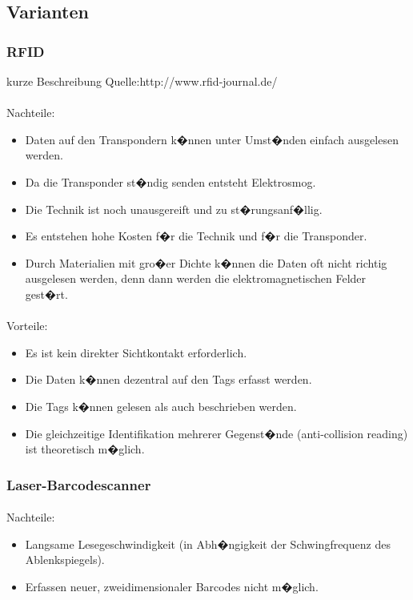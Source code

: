 \subsection{Varianten}

\subsubsection{RFID}

kurze Beschreibung
Quelle:http://www.rfid-journal.de/

\paragraph*{}
Nachteile:
\begin{itemize}
\item Daten auf den Transpondern k�nnen unter Umst�nden einfach ausgelesen werden.
\item Da die Transponder st�ndig senden entsteht Elektrosmog.
\item Die Technik ist noch unausgereift und zu st�rungsanf�llig.
\item Es entstehen hohe Kosten f�r die Technik und f�r die Transponder.
\item Durch Materialien mit gro�er Dichte k�nnen die Daten oft nicht richtig ausgelesen werden, denn dann werden die elektromagnetischen Felder gest�rt.
\end{itemize}

\paragraph*{}
Vorteile:
\begin{itemize}
\item Es ist kein direkter Sichtkontakt erforderlich.
\item Die Daten k�nnen dezentral auf den Tags erfasst werden.
\item Die Tags k�nnen gelesen als auch beschrieben werden.
\item Die gleichzeitige Identifikation mehrerer Gegenst�nde (anti-collision reading) ist theoretisch m�glich.
\end{itemize}

\subsubsection{Laser-Barcodescanner}
\paragraph*{}
Nachteile:
\begin{itemize}
\item Langsame Lesegeschwindigkeit (in Abh�ngigkeit der Schwingfrequenz des Ablenkspiegels).
\item Erfassen neuer, zweidimensionaler Barcodes nicht m�glich.
\end{itemize}

